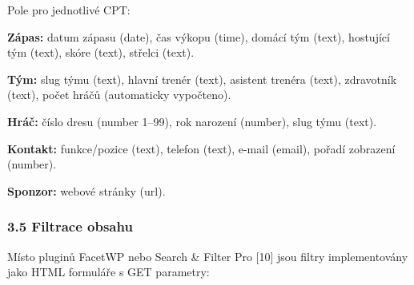 \begin{Shaded}
\begin{Highlighting}[]
    \OtherTok{,}
    \OtherTok{,}
    \OtherTok{,}
    \OtherTok{,}
    \OtherTok{,}
\NormalTok{)}\OtherTok{;}
\end{Highlighting}
\end{Shaded}

Pole pro jednotlivé CPT:

\textbf{Zápas:} datum zápasu (date), čas výkopu (time), domácí tým
(text), hostující tým (text), skóre (text), střelci (text).

\textbf{Tým:} slug týmu (text), hlavní trenér (text), asistent trenéra
(text), zdravotník (text), počet hráčů (automaticky vypočteno).

\textbf{Hráč:} číslo dresu (number 1--99), rok narození (number), slug
týmu (text).

\textbf{Kontakt:} funkce/pozice (text), telefon (text), e-mail (email),
pořadí zobrazení (number).

\textbf{Sponzor:} webové stránky (url).

\subsubsection{3.5 Filtrace obsahu}\label{filtrace-obsahu}

Místo pluginů FacetWP nebo Search \& Filter Pro {[}10{]} jsou filtry
implementovány jako HTML formuláře s GET parametry:

